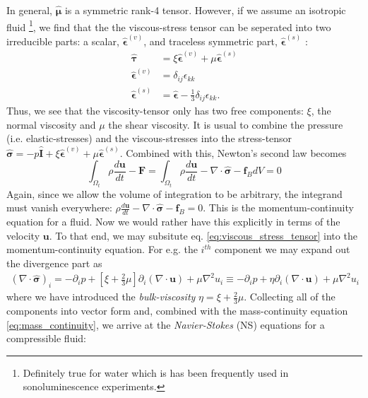 \documentclass[rmp,aps,nofootinbib,superscriptaddress,floatfix]{revtex4-2}
\begin{document}
In general, $\hat{\bm{\mu}}$ is a symmetric rank-4 tensor. However, if we assume an isotropic fluid \footnote{Definitely true for water which is has been frequently used in sonoluminescence experiments.}, we find that the the viscous-stress tensor can be seperated into two irreducible parts: a scalar, $\hat{\bm{\epsilon}}^{(v)}$, and traceless symmetric part, $\hat{\bm{\epsilon}}^{(s)}$ \cite{zee2016group,landau1987fluid}:
\begin{equation}
\begin{split}
    \hat{\bm{\tau}} & = \xi \hat{\bm{\epsilon}}^{(v)}+\mu \hat{\bm{\epsilon}}^{(s)} \\
    \hat{\bm{\epsilon}}^{(v)} & = \delta_{ij}\epsilon_{kk} \\
    \hat{\bm{\epsilon}}^{(s)} & = \hat{\bm{\epsilon}}-\frac{1}{3}\delta_{ij}\epsilon_{kk}.
    \label{eq:viscous_stress_tensor}
\end{split}
\end{equation}
Thus, we see that the viscosity-tensor only has two free components: $\xi$, the normal viscosity and $\mu$ the shear viscosity. It is usual to combine the pressure (i.e. elastic-stresses) and the viscous-stresses into the stress-tensor $\hat{\bm{\sigma}}=-p\hat{\bm{I}}+\xi \hat{\bm{\epsilon}}^{(v)}+\mu \hat{\bm{\epsilon}}^{(s)}$. Combined with this, Newton's second law becomes
\begin{equation}
    \int_{\Omega_t} \rho \frac{d \bm{u}}{dt}-\bm{F} = \int_{\Omega_t} \rho \frac{d \bm{u}}{dt} - \nabla \cdot \hat{\bm{\sigma}}-\bm{f}_B dV = 0
\end{equation}
Again, since we allow the volume of integration to be arbitrary, the integrand must vanish everywhere: $\rho \frac{d \bm{u}}{dt} - \nabla \cdot \hat{\bm{\sigma}}-\bm{f}_B=0$. This is the momentum-continuity equation for a fluid. Now we would rather have this explicitly in terms of the velocity $\bm{u}$. To that end, we may subsitute eq. \ref{eq:viscous_stress_tensor} into the momentum-continuity equation. For e.g. the $i^{th}$ component we may expand out the divergence part as 
\begin{equation}
\begin{split}
    \left(\nabla \cdot \hat{\bm{\sigma}}\right)_i = -\partial_i p + \left[\xi +\frac{2}{3}\mu \right] \partial_i(\nabla \cdot \bm{u})+\mu \nabla^2 u_i \equiv -\partial_i p + \eta \partial_i(\nabla \cdot \bm{u})+\mu \nabla^2 u_i
\end{split}
\end{equation}
where we have introduced the \emph{bulk-viscosity} $\eta=\xi+\frac{2}{3}\mu$. Collecting all of the components into vector form and, combined with the mass-continuity equation \ref{eq:mass_continuity}, we arrive at the \emph{Navier-Stokes} (NS) equations for a compressible fluid:
\end{document}

